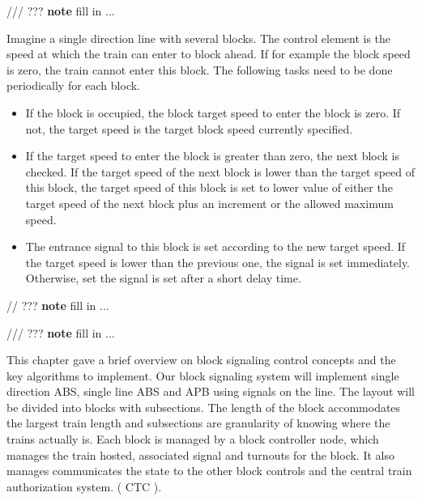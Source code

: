 /// ??? \textbf{note} fill in ...


Imagine a single direction line with several blocks. The control element is the speed at which the train can enter to block ahead. If for example the block speed is zero, the train cannot enter this block. The following tasks need to be done periodically for each block.
\begin{itemize}
\item If the block is occupied, the block target speed to enter the block is zero. If not, the target speed is the target block speed currently specified.
\item If the target speed to enter the block is greater than zero, the next block is checked. If the target speed of the next block is lower than the target speed of this block, the target speed of this block is set to lower value of either the target speed of the next block plus an increment or the allowed maximum speed.
\item The entrance signal to this block is set according to the new target speed. If the target speed is lower than the previous one, the signal is set immediately. Otherwise, set the signal is set after a short delay time.
\end{itemize}


// ??? \textbf{note} fill in ...


/// ??? \textbf{note} fill in ...




This chapter gave a brief overview on block signaling control concepts and the key algorithms to implement. Our block signaling system will implement single direction ABS, single line ABS and APB using signals on the line. The layout will be divided into blocks with subsections. The length of the block accommodates the largest train length and subsections are granularity of knowing where the trains actually is. Each block is managed by a block controller node, which manages the train hosted, associated signal and turnouts for the block. It also manages communicates the state to the other block controls and the central train authorization system. ( CTC ).

